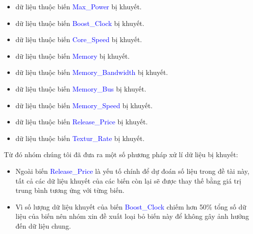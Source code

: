 \documentclass[a4paper]{article}
\newcommand{\gachdau}{\hspace*{1.5em}\ignorespaces}
\begin{document}
            \begin{itemize}[leftmargin=3.5em, itemsep=-0.15em]
                \vspace{-7pt}
                \item \fontsize{13pt}{15pt} dữ liệu thuộc biến \textcolor{blue}{Max\_Power} bị khuyết.
                \item \fontsize{13pt}{15pt} dữ liệu thuộc biến \textcolor{blue}{Boost\_Clock} bị khuyết.
                \item \fontsize{13pt}{15pt} dữ liệu thuộc biến \textcolor{blue}{Core\_Speed} bị khuyết.
                \item \fontsize{13pt}{15pt} dữ liệu thuộc biến \textcolor{blue}{Memory} bị khuyết.
                \item \fontsize{13pt}{15pt} dữ liệu thuộc biến \textcolor{blue}{Memory\_Bandwidth} bị khuyết.
                \item \fontsize{13pt}{15pt} dữ liệu thuộc biến \textcolor{blue}{Memory\_Bus} bị khuyết.
                \item \fontsize{13pt}{15pt} dữ liệu thuộc biến \textcolor{blue}{Memory\_Speed} bị khuyết.
                \item \fontsize{13pt}{15pt} dữ liệu thuộc biến \textcolor{blue}{Release\_Price} bị khuyết.
                \item \fontsize{13pt}{15pt} dữ liệu thuộc biến \textcolor{blue}{Textur\_Rate}  bị khuyết.
            \end{itemize}
            \vspace{-5pt}
            \gachdau
            Từ đó nhóm chúng tôi đã đưa ra một số phương pháp xử lí dữ liệu bị khuyết:
            \begin{itemize}[leftmargin=3.5em, itemsep=-0.15em]
                \vspace{-7pt}
                \item \fontsize{13pt}{15pt}\selectfont Ngoài biến \textcolor{blue}{Release\_Price} là yếu tố chính để dự đoán số liệu trong đề tài này, tất cả các dữ liệu khuyết của các biến còn lại sẽ được thay thế bằng giá trị trung bình tương ứng với từng biến.
                \item \fontsize{13pt}{15pt}\selectfont Vì số lượng dữ liệu khuyết của biến \textcolor{blue}{Boost\_Clock} chiếm hơn 50\% tổng số dữ liệu của biến nên nhóm xin đề xuất loại bỏ biến này để không gây ảnh hưởng đến dữ liệu chung.
            \end{itemize}
\end{document}
